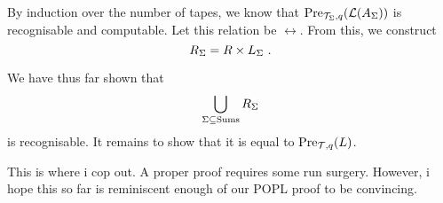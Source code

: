 By induction over the number of tapes, we know that
${\text{Pre}_{\mathcal{T}_\Sigma,q}}\mathord{\left({\mathcal{L}}\mathord{\left(A_\Sigma\right)}\right)}$
is recognisable and computable.
Let this relation be $\rel$.
From this, we construct
\[
    R_\Sigma = R \times L_\Sigma \ .
\]

We have thus far shown that
\[
    \bigcup\limits_{\Sigma \subseteq \text{Sums}}
        R_\Sigma
\]
is recognisable.
It remains to show that it is equal to
${\text{Pre}_{\mathcal{T},q}}\mathord{\left(L\right)}$.

\begin{remark}
    This is where i cop out.
    A proper proof requires some run surgery.
    However, i hope this so far is reminiscent enough of our POPL proof to be convincing.
\end{remark}
